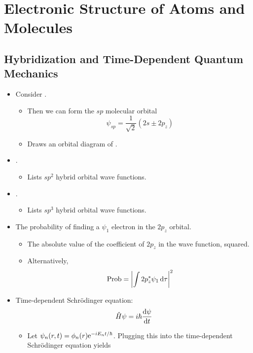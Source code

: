 \documentclass[../notes.tex]{subfiles}
\begin{document}
\chapter{Electronic Structure of Atoms and Molecules}
\section{Hybridization and Time-Dependent Quantum Mechanics}
\begin{itemize}
    \item {}Consider .
    \begin{itemize}
        \item Then we can form the $sp$ molecular orbital
        \begin{equation*}
            \psi_{sp} = \frac{1}{\sqrt{2}}(2s\pm 2p_z)
        \end{equation*}
        \item Draws an orbital diagram of .
    \end{itemize}
    \item {}.
    \begin{itemize}
        \item Lists $sp^2$ hybrid orbital wave functions.
    \end{itemize}
    \item {}.
    \begin{itemize}
        \item Lists $sp^3$ hybrid orbital wave functions.
    \end{itemize}
    \item The probability of finding a $\psi_1$ electron in the $2p_z$ orbital.
    \begin{itemize}
        \item The absolute value of the coefficient of $2p_z$ in the wave function, squared.
        \item Alternatively,
        \begin{equation*}
            \Prob = \left| \int 2p_z^*\psi_1\dd{\tau} \right|^2
        \end{equation*}
    \end{itemize}
    \item Time-dependent Schr\"{o}dinger equation:
    \begin{equation*}
        \hat{H}\psi = i\hbar\dv{\psi}{t}
    \end{equation*}
    \begin{itemize}
        \item Let $\psi_n(r,t)=\phi_n(r)\e[-iE_nt/\hbar]$. Plugging this into the time-dependent Schr\"{o}dinger equation yields

\end{itemize}
\end{itemize}
\end{document}
